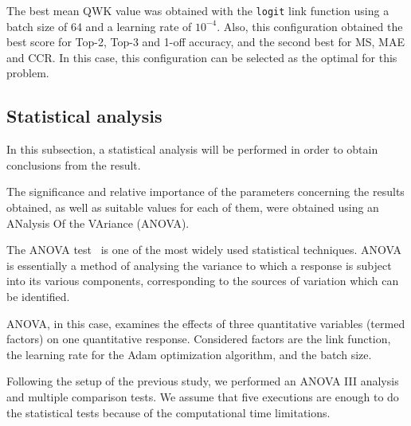 \documentclass[journal]{IEEEtran}
\begin{document}
	The best mean QWK value was obtained with the \texttt{logit} link function using a batch size of 64 and a learning rate of $10^{-4}$. Also, this configuration obtained the best score for Top-2, Top-3 and 1-off accuracy, and the second best for MS, MAE and CCR. In this case, this configuration can be selected as the optimal for this problem.
	
	\subsection{Statistical analysis}
	\label{sect:statisticalanalysis}
	In this subsection, a statistical analysis will be performed in order to obtain conclusions from the result.
	
	The significance and relative importance of the parameters concerning the results obtained, as well as suitable values for each of them, were obtained using an ANalysis Of the VAriance (ANOVA).
	
	The ANOVA test~\cite{miller1997beyond} is one of the most widely used statistical techniques. ANOVA is essentially a method of analysing the variance to which a response is subject into its various components, corresponding to the sources of variation which can be identified.
	
	ANOVA, in this case, examines the effects of three quantitative variables (termed factors) on one quantitative response. Considered factors are the link function, the learning rate for the Adam optimization algorithm, and the batch size. 
	
	Following the setup of the previous study, we performed an ANOVA III analysis and multiple comparison tests. We assume that five executions are enough to do the statistical tests because of the computational time limitations.
	
\end{document}
